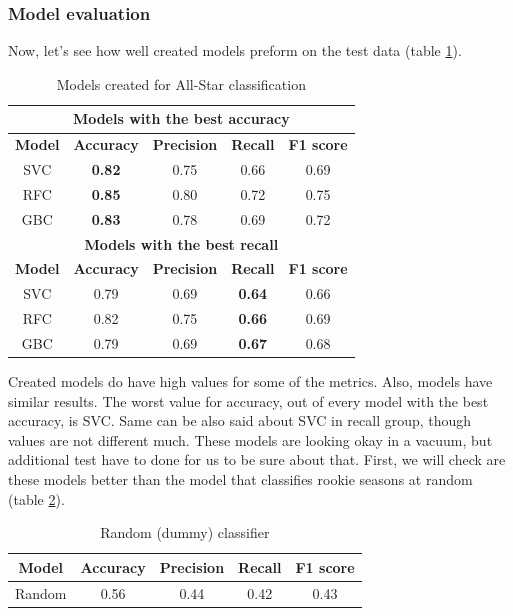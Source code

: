 \documentclass[a4paper]{article}
\begin{document}
\subsubsection{Model evaluation}
\label{subsubsec:model_eval_all_star}

Now, let's see how well created models preform on the test data (table \ref{tab:models_all_star}).

\begin{table}[!h]
\begin{center}
\begin{tabular}{|c|c|c|c|c|} \hline
\multicolumn{5}{|c|}{\textbf{Models with the best accuracy}} \\ \hline
\textbf{Model} & \textbf{Accuracy} & \textbf{Precision} & \textbf{Recall} & \textbf{F1 score} \\ \hline
SVC & \textbf{0.82} & 0.75 & 0.66 & 0.69 \\ \hline
RFC & \textbf{0.85} & 0.80 & 0.72 & 0.75 \\ \hline
GBC & \textbf{0.83} & 0.78 & 0.69 & 0.72 \\ \hline
\multicolumn{5}{|c|}{\textbf{Models with the best recall}} \\ \hline
\textbf{Model} & \textbf{Accuracy} & \textbf{Precision} & \textbf{Recall} & \textbf{F1 score} \\ \hline
SVC & 0.79 & 0.69 & \textbf{0.64} & 0.66 \\ \hline
RFC & 0.82 & 0.75 & \textbf{0.66} & 0.69 \\ \hline
GBC & 0.79 & 0.69 & \textbf{0.67} & 0.68 \\ \hline
\end{tabular}
\caption{Models created for All-Star classification}
\label{tab:models_all_star}
\end{center}
\end{table}

Created models do have high values for some of the metrics. Also, models have similar results. The worst value for accuracy, out of every model with the best accuracy, is SVC. Same can be also said about SVC in recall group, though values are not different much. These models are looking okay in a vacuum, but additional test have to done for us to be sure about that. First, we will check are these models better than the model that classifies rookie seasons at random (table \ref{tab:dummy_all_star}).

\begin{table}[!h]
\begin{center}
\begin{tabular}{|c|c|c|c|c|} \hline
\textbf{Model} & \textbf{Accuracy} & \textbf{Precision} & \textbf{Recall} & \textbf{F1 score} \\ \hline
Random & 0.56 & 0.44 & 0.42 & 0.43 \\ \hline
\end{tabular}
\caption{Random (dummy) classifier}
\label{tab:dummy_all_star}
\end{center}
\end{table}
\end{document}
